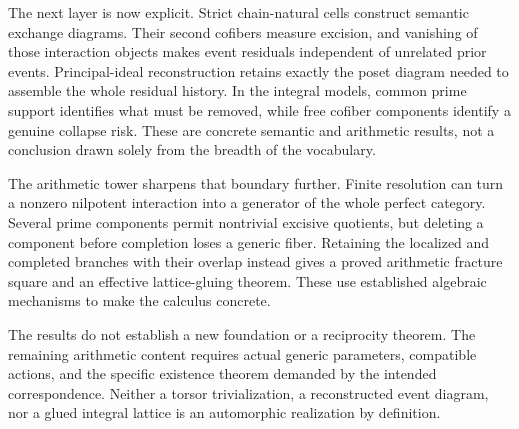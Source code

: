 \documentclass[11pt]{article}
\theoremstyle{definition}
\theoremstyle{remark}
\begin{document}
The next layer is now explicit. Strict chain-natural cells construct semantic exchange diagrams. Their second cofibers measure excision, and vanishing of those interaction objects makes event residuals independent of unrelated prior events. Principal-ideal reconstruction retains exactly the poset diagram needed to assemble the whole residual history. In the integral models, common prime support identifies what must be removed, while free cofiber components identify a genuine collapse risk. These are concrete semantic and arithmetic results, not a conclusion drawn solely from the breadth of the vocabulary.

The arithmetic tower sharpens that boundary further. Finite resolution can turn a nonzero nilpotent interaction into a generator of the whole perfect category. Several prime components permit nontrivial excisive quotients, but deleting a component before completion loses a generic fiber. Retaining the localized and completed branches with their overlap instead gives a proved arithmetic fracture square and an effective lattice-gluing theorem. These use established algebraic mechanisms to make the calculus concrete.

The results do not establish a new foundation or a reciprocity theorem. The remaining arithmetic content requires actual generic parameters, compatible actions, and the specific existence theorem demanded by the intended correspondence. Neither a torsor trivialization, a reconstructed event diagram, nor a glued integral lattice is an automorphic realization by definition.
\end{document}
